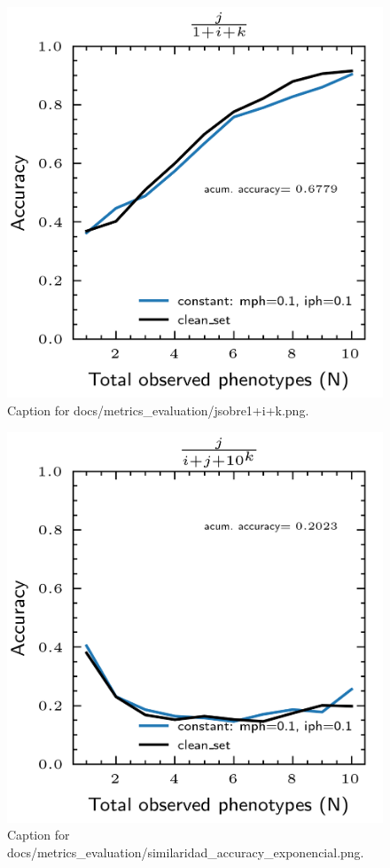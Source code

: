 \documentclass{article}
\begin{document}
\begin{figure}[h] \centering \includegraphics{docs/metrics_evaluation/jsobre1+i+k.png} \caption{Caption for docs/metrics_evaluation/jsobre1+i+k.png.} \end{figure}
\begin{figure}[h] \centering \includegraphics{docs/metrics_evaluation/similaridad_accuracy_exponencial.png} \caption{Caption for docs/metrics_evaluation/similaridad_accuracy_exponencial.png.} \end{figure}
\end{document}
